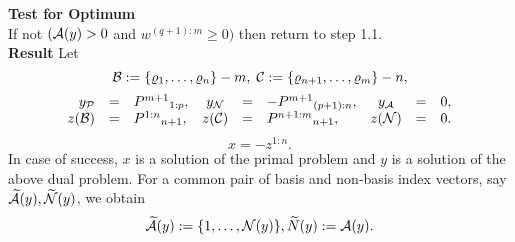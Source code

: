 {\bf Test for Optimum}\\
If not $(\A(y) > 0$ and $w^{(q+1):m} \geq 0)$ then
return to step 1.1.\\
{\bf Result} Let
\[
\B := \{\rho_1, \ldots,\rho_n\} - m, \;
\C := \{\rho_{n+1}, \ldots, \rho_m\} - n,
\]
\[ \ba{.}{rclcrlcrl}
y_{\P}&=& P^{m+1}{}_{1:p},& y_{\N} &=& - P^{m+1}{}_{(p+1):n},
&y_{\A} &=& 0,\\
z(\B)  &=& P^{1:n}{}_{n+1},& z(\C) &=& P^{n+1:m}{}_{n+1}, &  z(\N) &=& 0 .
\ea{.}
\]
\[
x = - z^{1:n}.
\]
In case of success, $x$ is a solution of the primal problem and $y$ is a
solution of the above dual problem. For a common pair of basis and non-basis
index vectors, say $\wi{\A}(y), \wi{\N}(y)$, we obtain
\[
\wi{\A}(y) := \{1,\ldots,\N(y)\}, \wi{N}(y) := \A(y) .
\]
